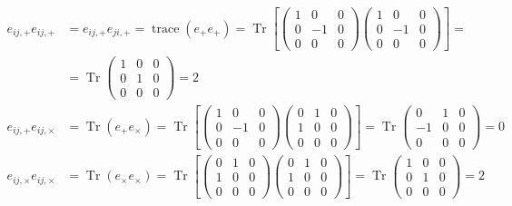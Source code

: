 \documentclass[../template.tex]{subfiles}
\begin{document}
\begin{align*}
    e_{ij,+} e_{ij,+} &= e_{ij,+} e_{ji,+} = \operatorname{trace}(e_+ e_+) = \operatorname{Tr} \left[\left(\begin{array}{ccc}
    1 & 0 & 0 \\ 
    0 & -1 & 0 \\ 
    0 & 0 & 0
    \end{array}\right) \left(\begin{array}{ccc}
    1 & 0 & 0 \\ 
    0 & -1 & 0 \\ 
    0 & 0 & 0
    \end{array}\right)\right]   =\\
    &= \operatorname{Tr} \left(\begin{array}{ccc}
    1 & 0 & 0 \\ 
    0 & 1 & 0 \\ 
    0 & 0 & 0
    \end{array}\right) = 2\\ 
    e_{ij,+} e_{ij,\times} &= \operatorname{Tr} (e_+ e_\times) = \operatorname{Tr}\left[\left(\begin{array}{ccc}
    1 & 0 & 0 \\ 
    0 & -1 & 0 \\ 
    0 & 0 & 0
    \end{array}\right) \left(\begin{array}{ccc}
    0 & 1 & 0 \\ 
    1 & 0 & 0 \\ 
    0 & 0 & 0
    \end{array}\right)\right]  = \operatorname{Tr} \left(\begin{array}{ccc}
    0 & 1 & 0 \\ 
    -1 & 0 & 0 \\ 
    0 & 0 & 0
    \end{array}\right)  = 0\\
    e_{ij,\times}e_{ij,\times} &= \operatorname{Tr} (e_\times e_\times) = \operatorname{Tr}\left[\left(\begin{array}{ccc}
    0 & 1 & 0 \\ 
    1 & 0 & 0 \\ 
    0 & 0 & 0
    \end{array}\right) \left(\begin{array}{ccc}
    0 & 1 & 0 \\ 
    1 & 0 & 0 \\ 
    0 & 0 & 0
    \end{array}\right)\right] = \operatorname{Tr}\left(\begin{array}{ccc}
    1 & 0 & 0 \\ 
    0 & 1 & 0 \\ 
    0 & 0 & 0
    \end{array}\right)   = 2
\end{align*}
\end{document}
